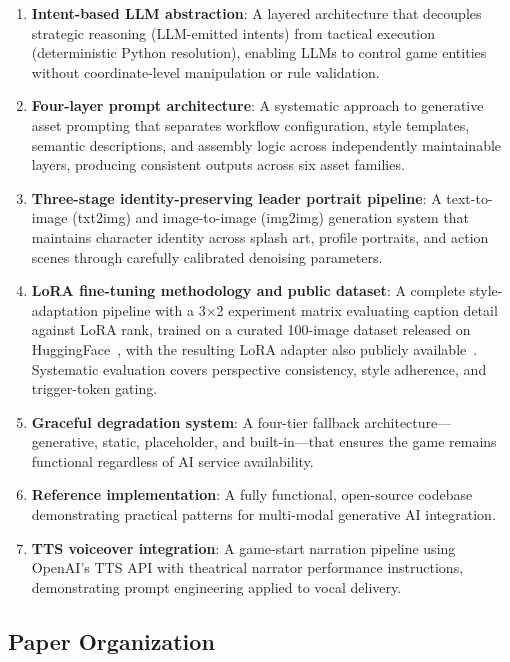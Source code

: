 \documentclass[conference]{IEEEtran}
\begin{document}
\begin{enumerate}
\item \textbf{Intent-based LLM abstraction}: A layered architecture that
  decouples strategic reasoning (LLM-emitted intents) from tactical
  execution (deterministic Python resolution), enabling LLMs to control
  game entities without coordinate-level manipulation or rule validation.

\item \textbf{Four-layer prompt architecture}: A systematic approach to
  generative asset prompting that separates workflow configuration, style
  templates, semantic descriptions, and assembly logic across independently
  maintainable layers, producing consistent outputs across six asset
  families.

\item \textbf{Three-stage identity-preserving leader portrait pipeline}: A
  text-to-image (txt2img) and image-to-image (img2img) generation system that maintains character identity across splash
  art, profile portraits, and action scenes through carefully calibrated
  denoising parameters.

\item \textbf{LoRA fine-tuning methodology and public dataset}: A complete style-adaptation
  pipeline with a 3$\times$2 experiment matrix evaluating caption detail
  against LoRA rank, trained on a curated 100-image dataset released on
  HuggingFace~\cite{asakskogen2026topdown}, with the resulting LoRA
  adapter also publicly available~\cite{asakskogen2026strategai}.
  Systematic evaluation covers perspective consistency, style adherence,
  and trigger-token gating.

\item \textbf{Graceful degradation system}: A four-tier fallback
  architecture---generative, static, placeholder, and built-in---that
  ensures the game remains functional regardless of AI service availability.

\item \textbf{Reference implementation}: A fully functional, open-source
  codebase demonstrating practical patterns for multi-modal generative AI
  integration.
\item \textbf{TTS voiceover integration}: A game-start narration pipeline
  using OpenAI's TTS API with theatrical narrator performance instructions,
  demonstrating prompt engineering applied to vocal delivery.
\end{enumerate}

\subsection{Paper Organization}
\label{sec:organization}
\end{document}
